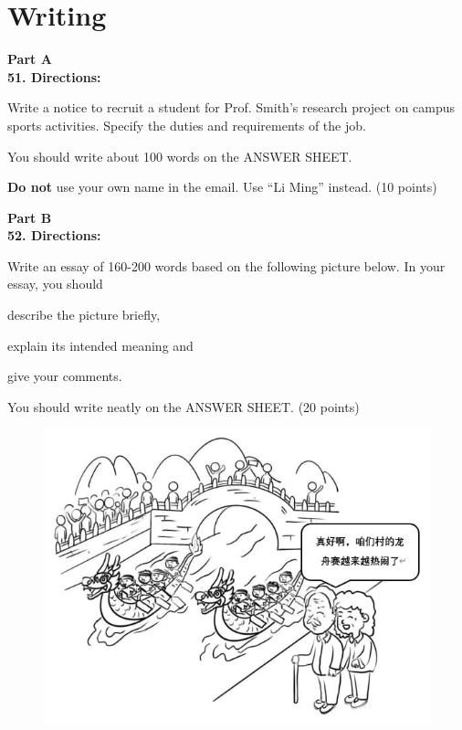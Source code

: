 \newpage
\section{Writing}


\noindent
\textbf{Part A}\\
\textbf{51. Directions:}

Write a notice to recruit a student for Prof. Smith's research project on campus sports activities. Specify the duties and requirements of the job.

You should write about 100 words on the ANSWER SHEET.

\textbf{Do not} use your own name in the email. Use ``Li Ming'' instead. (10
points)


\vspace{2em}

\noindent
\textbf{Part B}\\
\textbf{52. Directions:}

Write an essay of 160-200 words based on the following picture below. In
your essay, you should
\begin{listwrite}
\item 
 describe the picture briefly,

\item 
 explain its intended meaning and

\item 
 give your comments.
\end{listwrite}

You should write neatly on the ANSWER SHEET. (20 points)

\begin{figure}[h!]
	\centering
	\includegraphics[width=0.55\linewidth]{picture/2023.png}
\end{figure}


